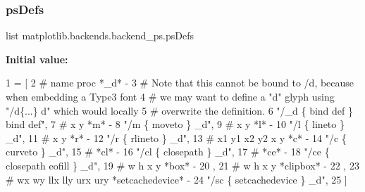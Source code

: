 \mbox{\label{namespacematplotlib_1_1backends_1_1backend__ps_a12b37e17a387319d1aade2a56ccaa1f1}} 
\subsubsection{\texorpdfstring{ps\+Defs}{psDefs}}
{\footnotesize\ttfamily list matplotlib.\+backends.\+backend\+\_\+ps.\+ps\+Defs}

{\bfseries Initial value\+:}
\begin{DoxyCode}
1 =  [
2     \textcolor{comment}{# name proc  *\_d*  -}
3     \textcolor{comment}{# Note that this cannot be bound to /d, because when embedding a Type3 font}
4     \textcolor{comment}{# we may want to define a "d" glyph using "/d\{...\} d" which would locally}
5     \textcolor{comment}{# overwrite the definition.}
6     \textcolor{stringliteral}{"/\_d \{ bind def \} bind def"},
7     \textcolor{comment}{# x y  *m*  -}
8     \textcolor{stringliteral}{"/m \{ moveto \} \_d"},
9     \textcolor{comment}{# x y  *l*  -}
10     \textcolor{stringliteral}{"/l \{ lineto \} \_d"},
11     \textcolor{comment}{# x y  *r*  -}
12     \textcolor{stringliteral}{"/r \{ rlineto \} \_d"},
13     \textcolor{comment}{# x1 y1 x2 y2 x y *c*  -}
14     \textcolor{stringliteral}{"/c \{ curveto \} \_d"},
15     \textcolor{comment}{# *cl*  -}
16     \textcolor{stringliteral}{"/cl \{ closepath \} \_d"},
17     \textcolor{comment}{# *ce*  -}
18     \textcolor{stringliteral}{"/ce \{ closepath eofill \} \_d"},
19     \textcolor{comment}{# w h x y  *box*  -}
20     ,
21     \textcolor{comment}{# w h x y  *clipbox*  -}
22     ,
23     \textcolor{comment}{# wx wy llx lly urx ury  *setcachedevice*  -}
24     \textcolor{stringliteral}{"/sc \{ setcachedevice \} \_d"},
25 ]
\end{DoxyCode}
